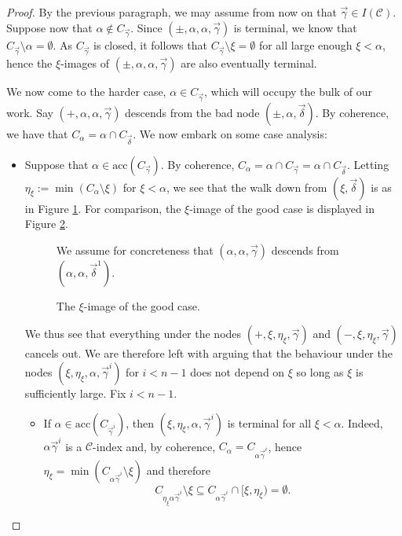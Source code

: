\documentclass{amsart}
\numberwithin{theorem}{section}
\theoremstyle{definition}
\renewcommand{\subset}{\subseteq}
\newcommand{\acc}{\mathrm{acc}}
\newcommand{\C}{\mathcal{C}}
\begin{document}
\begin{proof}
By the previous paragraph, we may assume from now on that $\vec\gamma\in I(\C)$. Suppose now that $\alpha\not\in C_{\vec\gamma}$. Since $(\pm,\alpha,\alpha,\vec\gamma)$ is terminal, we know that $C_{\vec\gamma}\setminus \alpha=\emptyset$. As $C_{\vec\gamma}$ is closed, it follows that $C_{\vec\gamma}\setminus \xi=\emptyset$ for all large enough $\xi<\alpha$, hence the $\xi$-images of $(\pm,\alpha,\alpha,\vec\gamma)$ are also eventually terminal.

We now come to the harder case, $\alpha\in C_{\vec\gamma}$, which will occupy the bulk of our work. Say $(+,\alpha,\alpha,\vec\gamma)$ descends from the bad node $(\pm,\alpha,\vec\delta)$. By coherence, we have that $C_\alpha=\alpha\cap C_{\vec\delta}$. We now embark on some case analysis:
\begin{itemize}
\item Suppose that $\alpha\in\acc(C_{\vec\gamma})$. By coherence, $C_\alpha=\alpha\cap C_{\vec\gamma}=\alpha\cap C_{\vec\delta}$. Letting $\eta_\xi:=\min(C_\alpha\setminus\xi)$ for $\xi<\alpha$, we see that the walk down from $(\xi,\vec\delta)$ is as in Figure \ref{bad_n_xi}. For comparison, the $\xi$-image of the good case is displayed in Figure \ref{good_n}.

\begin{figure}[ht]
\caption{We assume for concreteness that $(\alpha,\alpha,\vec\gamma)$ descends from $(\alpha,\alpha,\vec\delta^1)$.}
\label{bad_n_xi}
\end{figure}

\begin{figure}[ht]
\caption{The $\xi$-image of the good case.}
\label{good_n}
\end{figure}

We thus see that everything under the nodes $(+,\xi,\eta_\xi,\vec\gamma)$ and $(-,\xi,\eta_\xi,\vec\gamma)$ cancels out. We are therefore left with arguing that the behaviour under the nodes $(\xi,\eta_\xi,\alpha,\vec\gamma^i)$ for $i<n-1$ does not depend on $\xi$ so long as $\xi$ is sufficiently large. Fix $i<n-1$.

\begin{itemize}
\item If $\alpha\in \acc(C_{\vec \gamma^i})$, then $(\xi,\eta_\xi,\alpha,\vec\gamma^i)$ is terminal for all $\xi<\alpha$. Indeed, $\alpha\vec\gamma^i$ is a $\C$-index and, by coherence, $C_\alpha=C_{\alpha\vec\gamma^i}$, hence $\eta_\xi=\min(C_{\alpha\vec\gamma^i}\setminus\xi)$ and therefore 
\[C_{\eta_\xi\alpha\vec\gamma^i}\setminus\xi\subset C_{\alpha\vec\gamma^i}\cap [\xi,\eta_\xi)=\emptyset.\]


\end{itemize}
\end{itemize}
\end{proof}
\end{document}
